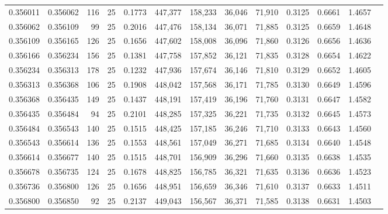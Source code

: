 \begin{tabular}{rrrrrrrrrrrrr}
0.356011 & 0.356062 &   116 &  25 &                                     0.1773 & 447,377 & 158,233 &  36,046 &  71,910 & 0.3125 & 0.6661 & 1.4657 \\
0.356062 & 0.356109 &    99 &  25 &                                     0.2016 & 447,476 & 158,134 &  36,071 &  71,885 & 0.3125 & 0.6659 & 1.4648 \\
0.356109 & 0.356165 &   126 &  25 &                                     0.1656 & 447,602 & 158,008 &  36,096 &  71,860 & 0.3126 & 0.6656 & 1.4636 \\
0.356166 & 0.356234 &   156 &  25 &                                     0.1381 & 447,758 & 157,852 &  36,121 &  71,835 & 0.3128 & 0.6654 & 1.4622 \\
0.356234 & 0.356313 &   178 &  25 &                                     0.1232 & 447,936 & 157,674 &  36,146 &  71,810 & 0.3129 & 0.6652 & 1.4605 \\
0.356313 & 0.356368 &   106 &  25 &                                     0.1908 & 448,042 & 157,568 &  36,171 &  71,785 & 0.3130 & 0.6649 & 1.4596 \\
0.356368 & 0.356435 &   149 &  25 &                                     0.1437 & 448,191 & 157,419 &  36,196 &  71,760 & 0.3131 & 0.6647 & 1.4582 \\
0.356435 & 0.356484 &    94 &  25 &                                     0.2101 & 448,285 & 157,325 &  36,221 &  71,735 & 0.3132 & 0.6645 & 1.4573 \\
0.356484 & 0.356543 &   140 &  25 &                                     0.1515 & 448,425 & 157,185 &  36,246 &  71,710 & 0.3133 & 0.6643 & 1.4560 \\
0.356543 & 0.356614 &   136 &  25 &                                     0.1553 & 448,561 & 157,049 &  36,271 &  71,685 & 0.3134 & 0.6640 & 1.4548 \\
0.356614 & 0.356677 &   140 &  25 &                                     0.1515 & 448,701 & 156,909 &  36,296 &  71,660 & 0.3135 & 0.6638 & 1.4535 \\
0.356678 & 0.356735 &   124 &  25 &                                     0.1678 & 448,825 & 156,785 &  36,321 &  71,635 & 0.3136 & 0.6636 & 1.4523 \\
0.356736 & 0.356800 &   126 &  25 &                                     0.1656 & 448,951 & 156,659 &  36,346 &  71,610 & 0.3137 & 0.6633 & 1.4511 \\
0.356800 & 0.356850 &    92 &  25 &                                     0.2137 & 449,043 & 156,567 &  36,371 &  71,585 & 0.3138 & 0.6631 & 1.4503 \\

\end{tabular}
